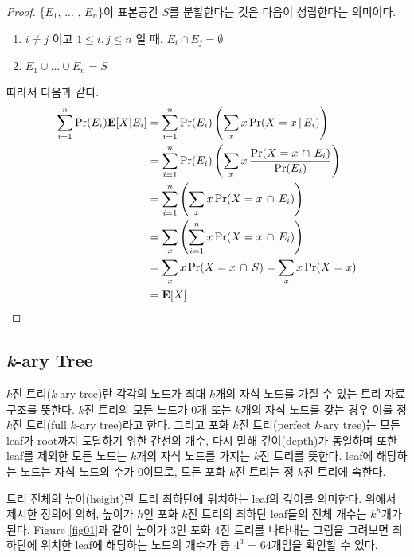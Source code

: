 \documentclass[11pt]{article}
\begin{document}
\singlespacing
\begin{proof}
\{$E_{1}$, ... , $E_{n}$\}이 표본공간 $S$를 분할한다는 것은 다음이 성립한다는 의미이다.
\begin{enumerate}
    \item $i \neq j$ 이고 $1 \le i,j \le n$ 일 때, $E_{i} \cap E_{j} = \emptyset$
    \item $E_{1} \cup \ldots \cup E_{n} = S$
\end{enumerate}
따라서 다음과 같다.
\[
\begin{split}
\sum_{i=1}^{n} \textnormal{Pr}(E_{i})\textbf{E}[X|E_{i}] & = \sum_{i=1}^{n} \textnormal{Pr}(E_{i}) \left(\sum_{x} x\,\textnormal{Pr}(X = x\,|\,E_{i})\right)\\
& = \sum_{i=1}^{n} \textnormal{Pr}(E_{i}) \left(\sum_{x} x\,\frac{\textnormal{Pr}(X = x\,\cap\,E_{i})}{\textnormal{Pr}(E_{i})}\right)\\
& = \sum_{i=1}^{n} \left(\sum_{x} x\,\textnormal{Pr}(X = x\,\cap\,E_{i})\right)\\
& = \sum_{x} \left(\sum_{i=1}^{n} x\,\textnormal{Pr}(X = x\,\cap\,E_{i})\right)\\
& = \sum_{x} x\,\textnormal{Pr}(X = x\,\cap\,S) = \sum_{x} x\,\textnormal{Pr}(X = x)\\
& = \textbf{E}[X]
\end{split}
\]
\end{proof}
\doublespacing

\subsection{\textit{k}-ary Tree}
$k$진 트리(\textit{k}-ary tree)란 각각의 노드가 최대 $k$개의 자식 노드를 가질 수 있는 트리 자료구조를 뜻한다. $k$진 트리의 모든 노드가 0개 또는 $k$개의 자식 노드를 갖는 경우 이를 정 $k$진 트리(full $k$-ary tree)라고 한다. 그리고 포화 $k$진 트리(perfect \textit{k}-ary tree)는 모든 leaf가 root까지 도달하기 위한 간선의 개수, 다시 말해 깊이(depth)가 동일하며 또한 leaf를 제외한 모든 노드는 $k$개의 자식 노드를 가지는 $k$진 트리를 뜻한다. leaf에 해당하는 노드는 자식 노드의 수가 0이므로, 모든 포화 $k$진 트리는 정 $k$진 트리에 속한다.

트리 전체의 높이(height)란 트리 최하단에 위치하는 leaf의 깊이를 의미한다. 위에서 제시한 정의에 의해, 높이가 $h$인 포화 $k$진 트리의 최하단 leaf들의 전체 개수는 $k^h$개가 된다. Figure \ref{fig01}과 같이 높이가 3인 포화 4진 트리를 나타내는 그림을 그려보면 최하단에 위치한 leaf에 해당하는 노드의 개수가 총 $4^3$ = 64개임을 확인할 수 있다.\\
\end{document}
